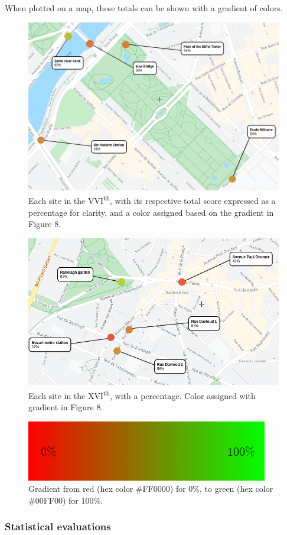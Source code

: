 \documentclass[11pt,letterpaper]{article}
\begin{document}
When plotted on a map, these totals can be shown with a gradient of colors.

\begin{figure}[H]
    \centering
    \includegraphics[width=0.7\linewidth]{media/7eColors.png}
    \caption{Each site in the VVI\textsuperscript{th}, with its respective total score expressed as a percentage for clarity, and a color assigned based on the gradient in Figure 8.}
\end{figure}

\begin{figure}[H]
    \centering
    \includegraphics[width=0.7\linewidth]{media/16eColors.png}
    \caption{Each site in the XVI\textsuperscript{th}, with a percentage. Color assigned with gradient in Figure 8.}
\end{figure}


\begin{figure}[H]
    \centering
    \includegraphics[width=0.4\linewidth]{media/bipolar/gradient.png}
    \caption{Gradient from red (hex color \#FF0000) for 0\%, to green (hex color \#00FF00) for 100\%. }
\end{figure}


\subsubsection{Statistical evaluations}
\end{document}
